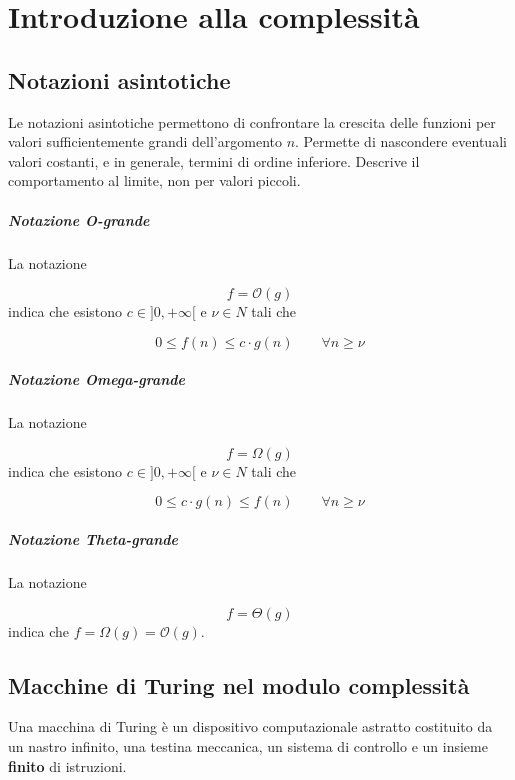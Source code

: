 \chapter{Introduzione alla complessità}

\section{Notazioni asintotiche}

Le notazioni asintotiche permettono di confrontare la crescita delle funzioni per valori sufficientemente grandi dell'argomento $n$. Permette di nascondere eventuali valori costanti, e in generale, termini di ordine inferiore. Descrive il comportamento al limite, non per valori piccoli.

\paragraph{Notazione O-grande}
La notazione

$$
f = \mathcal{O}(g)
$$
%
indica che esistono $c \in ]0, + \infty[$ e $\nu \in N$ tali che

$$
0 \leq f(n) \leq c \cdot g(n) \qquad \forall n \geq \nu
$$

\paragraph{Notazione Omega-grande}
La notazione

$$
f = \Omega(g)
$$
%
indica che esistono $c \in ]0, + \infty[$ e $\nu \in N$ tali che

$$
0 \leq c \cdot g(n) \leq f(n) \qquad \forall n \geq \nu
$$

\paragraph{Notazione Theta-grande}
La notazione

$$
f = \Theta(g)
$$
%
indica che $f = \Omega(g) = \mathcal{O}(g)$.



\section{Macchine di Turing nel modulo complessità}

Una macchina di Turing è un dispositivo computazionale astratto costituito da un nastro infinito, una testina meccanica, un sistema di controllo e un insieme \textbf{finito} di istruzioni.

